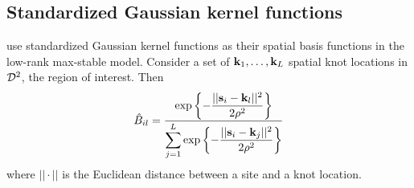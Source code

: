 \documentclass[11pt]{article}
\begin{document}
\subsection{Standardized Gaussian kernel functions} \label{eba:gskfunctions}
\citet{Reich2012} use standardized Gaussian kernel functions as their spatial basis functions in the low-rank max-stable model.
Consider a set of $\mbox{\bf k}_1, \ldots, \mbox{\bf k}_L$ spatial knot locations in ${\cal D}^2$, the region of interest.
Then
\begin{align}
  \hat{B}_{il} = \frac{\exp\left\{- \displaystyle\frac{||\mbox{\bf s}_i - \mbox{\bf k}_l||^2}{2 \rho^2} \right\}}{\displaystyle \sum_{j = 1}^L \exp\left\{- \frac{||\mbox{\bf s}_i - \mbox{\bf k}_j||^2}{2 \rho^2} \right\}}
\end{align}
where $|| \cdot ||$ is the Euclidean distance between a site and a knot location.
\end{document}
